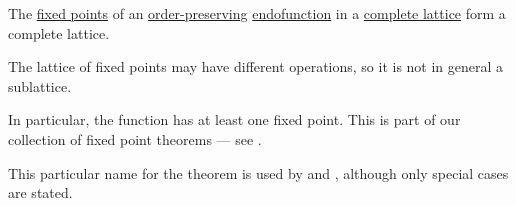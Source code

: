 \begin{theorem}\label{thm:knaster_tarski_theorem}
  The \hyperref[def:fixed_point]{fixed points} of an \hyperref[def:order_function]{order-preserving} \hyperref[def:function/endofunction]{endofunction} in a \hyperref[def:complete_lattice]{complete lattice} form a complete lattice.
\end{theorem}
\begin{comments}
  \item The lattice of fixed points may have different operations, so it is not in general a sublattice.

  \item In particular, the function has at least one fixed point. This is part of our collection of fixed point theorems --- see .

  \item This particular name for the theorem is used by  and , although only special cases are stated.
\end{comments}
